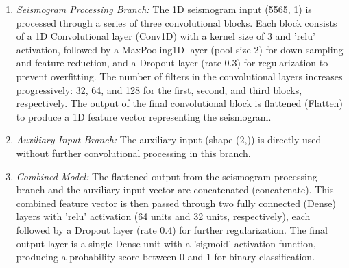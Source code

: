 \documentclass[conference]{IEEEtran}
\begin{document}
            \begin{enumerate}
                \item \textit{Seismogram Processing Branch:} The 1D seismogram input (5565, 1) is processed through a
                series of three convolutional blocks. Each block consists of a 1D Convolutional layer (Conv1D) with a
                kernel size of 3 and 'relu' activation, followed by a MaxPooling1D layer (pool size 2) for down-sampling
                and feature reduction, and a Dropout layer (rate 0.3) for regularization to prevent overfitting. The
                number of filters in the convolutional layers increases progressively: 32, 64, and 128 for the first,
                second, and third blocks, respectively. The output of the final convolutional block is flattened
                (Flatten) to produce a 1D feature vector representing the seismogram.
                
                \item \textit{Auxiliary Input Branch:} The auxiliary input (shape (2,)) is directly used without further
                convolutional processing in this branch.

                \item \textit{Combined Model:} The flattened output from the seismogram processing branch and the
                auxiliary input vector are concatenated (concatenate). This combined feature vector is then passed
                through two fully connected (Dense) layers with 'relu' activation (64 units and 32 units, respectively),
                each followed by a Dropout layer (rate 0.4) for further regularization. The final output layer is a
                single Dense unit with a 'sigmoid' activation function, producing a probability score between 0 and 1
                for binary classification.
            \end{enumerate}
\end{document}
